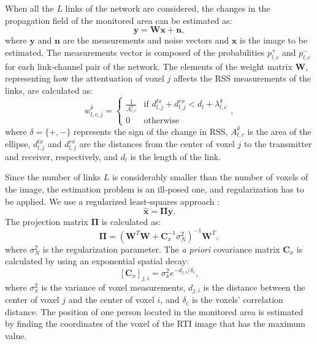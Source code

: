 \documentclass[conference]{IEEEtran}
\begin{document}
When all the $L$ links of the network are considered, the changes in the propagation field of the monitored area can be estimated as:
\begin{equation}\label{eq:linear_formulation}
    \mathbf{y} =  \mathbf{W}\mathbf{x}+\mathbf{n},
\end{equation}
where $\mathbf{y}$ and $\mathbf{n}$ are the measurements and noise vectors and $\mathbf{x}$ is the image to be estimated. The measurements vector is composed of the probabilities
$p^{+}_{l,c}$ and $p^{-}_{l,c}$ for each link-channel pair of the network. The elements of the weight matrix $\mathbf{W}$, representing how the attentuation of voxel $j$ affects the RSS measurements of the links, are calculated as:
\begin{equation}\label{eq:weight_matrix}
w^{\delta}_{l,c,j} = \begin{cases}
        \frac{1}{A^{\delta}_{l,c}} & \text{if } d_{l,j}^{tx}+d_{l,j}^{rx}<d_{l}+\lambda^{\delta}_{l,c}\\
        0 & \text{otherwise}
    \end{cases},
\end{equation}
where $\delta = \{+,-\}$ represents the sign of the change in RSS, $A^{\delta}_{l,c}$ is the area of the ellipse, $d_{l,j}^{tx}$ and $d_{l,j}^{rx}$ are the distances from the center of voxel $j$ to the transmitter and receiver, respectively, and $d_{l}$ is the length of the link.

Since the number of links $L$ is considerably smaller than the number of voxels of the image, the estimation problem is an ill-posed one, and regularization has to be applied. We use a regularized least-squares approach \cite{Patwari_corr_shadow_2008}:
\begin{equation}\label{eq:regularization}
    \hat{\mathbf{x}} =  \mathbf{\Pi}\mathbf{y}.
\end{equation}
The projection matrix $\mathbf{\Pi}$ is calculated as:
\begin{equation}\label{eq:projection_matrix}
    {\mathbf{\Pi}} = {(\mathbf{W}^T\mathbf{W}+\mathbf{C}_{x}^{-1}\sigma_{N}^{2})}^{-1}\mathbf{W}^T,
\end{equation}
where $\sigma_{N}^{2}$ is the regularization parameter. The \emph{a priori} covariance matrix $\mathbf{C}_{x}$ is calculated by using an exponential spatial decay:
\begin{equation}\label{E:cov_matrix}
    [\mathbf{C}_{x}]_{j,i}=\sigma_{x}^{2}e^{-d_{j,i} /\delta_{c}},
\end{equation}
where $\sigma_{x}^{2}$ is the variance of voxel measurements, $d_{j,i}$ is the distance between the center of voxel $j$ and the center of voxel $i$, and $\delta_{c}$ is the voxels' correlation distance. The position of one person located in the monitored area is estimated by finding the coordinates of the voxel of the RTI image that has the maximum value.
\end{document}
